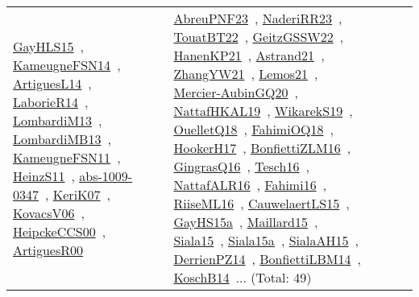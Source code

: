 {\begin{longtable}{lp{3cm}>{\raggedright\arraybackslash}p{6cm}>{\raggedright\arraybackslash}p{6cm}>{\raggedright\arraybackslash}p{8cm}}
\href{../works/GayHLS15.pdf}{GayHLS15}~\cite{GayHLS15}, \href{../works/KameugneFSN14.pdf}{KameugneFSN14}~\cite{KameugneFSN14}, \href{../works/ArtiguesL14.pdf}{ArtiguesL14}~\cite{ArtiguesL14}, \href{../works/LaborieR14.pdf}{LaborieR14}~\cite{LaborieR14}, \href{../works/LombardiM13.pdf}{LombardiM13}~\cite{LombardiM13}, \href{../works/LombardiMB13.pdf}{LombardiMB13}~\cite{LombardiMB13}, \href{../works/KameugneFSN11.pdf}{KameugneFSN11}~\cite{KameugneFSN11}, \href{../works/HeinzS11.pdf}{HeinzS11}~\cite{HeinzS11}, \href{../works/abs-1009-0347.pdf}{abs-1009-0347}~\cite{abs-1009-0347}, \href{../works/KeriK07.pdf}{KeriK07}~\cite{KeriK07}, \href{../works/KovacsV06.pdf}{KovacsV06}~\cite{KovacsV06}, \href{../works/HeipckeCCS00.pdf}{HeipckeCCS00}~\cite{HeipckeCCS00}, \href{../works/ArtiguesR00.pdf}{ArtiguesR00}~\cite{ArtiguesR00} & \href{../works/AbreuPNF23.pdf}{AbreuPNF23}~\cite{AbreuPNF23}, \href{../works/NaderiRR23.pdf}{NaderiRR23}~\cite{NaderiRR23}, \href{../works/TouatBT22.pdf}{TouatBT22}~\cite{TouatBT22}, \href{../works/GeitzGSSW22.pdf}{GeitzGSSW22}~\cite{GeitzGSSW22}, \href{../works/HanenKP21.pdf}{HanenKP21}~\cite{HanenKP21}, \href{../works/Astrand21.pdf}{Astrand21}~\cite{Astrand21}, \href{../works/ZhangYW21.pdf}{ZhangYW21}~\cite{ZhangYW21}, \href{../works/Lemos21.pdf}{Lemos21}~\cite{Lemos21}, \href{../works/Mercier-AubinGQ20.pdf}{Mercier-AubinGQ20}~\cite{Mercier-AubinGQ20}, \href{../works/NattafHKAL19.pdf}{NattafHKAL19}~\cite{NattafHKAL19}, \href{../works/WikarekS19.pdf}{WikarekS19}~\cite{WikarekS19}, \href{../works/OuelletQ18.pdf}{OuelletQ18}~\cite{OuelletQ18}, \href{../works/FahimiOQ18.pdf}{FahimiOQ18}~\cite{FahimiOQ18}, \href{../works/HookerH17.pdf}{HookerH17}~\cite{HookerH17}, \href{../works/BonfiettiZLM16.pdf}{BonfiettiZLM16}~\cite{BonfiettiZLM16}, \href{../works/GingrasQ16.pdf}{GingrasQ16}~\cite{GingrasQ16}, \href{../works/Tesch16.pdf}{Tesch16}~\cite{Tesch16}, \href{../works/NattafALR16.pdf}{NattafALR16}~\cite{NattafALR16}, \href{../works/Fahimi16.pdf}{Fahimi16}~\cite{Fahimi16}, \href{../works/RiiseML16.pdf}{RiiseML16}~\cite{RiiseML16}, \href{../works/CauwelaertLS15.pdf}{CauwelaertLS15}~\cite{CauwelaertLS15}, \href{../works/GayHS15a.pdf}{GayHS15a}~\cite{GayHS15a}, \href{../works/Maillard15.pdf}{Maillard15}~\cite{Maillard15}, \href{../works/Siala15.pdf}{Siala15}~\cite{Siala15}, \href{../works/Siala15a.pdf}{Siala15a}~\cite{Siala15a}, \href{../works/SialaAH15.pdf}{SialaAH15}~\cite{SialaAH15}, \href{../works/DerrienPZ14.pdf}{DerrienPZ14}~\cite{DerrienPZ14}, \href{../works/BonfiettiLBM14.pdf}{BonfiettiLBM14}~\cite{BonfiettiLBM14}, \href{../works/KoschB14.pdf}{KoschB14}~\cite{KoschB14}... (Total: 49)\\

\end{longtable}}

